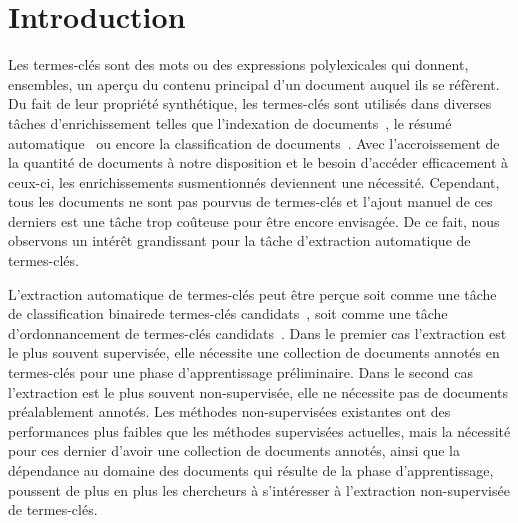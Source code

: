 \section{Introduction}
\label{sec:introduction}
  Les termes-clés sont des mots ou des expressions polylexicales qui donnent,
  ensembles, un aperçu du contenu principal d'un document auquel ils se
  réfèrent.
  Du fait de leur propriété synthétique, les termes-clés sont utilisés dans
  diverses tâches d'enrichissement telles que l'indexation de
  documents~\cite{medelyan2008smalltrainingset}, le résumé
  automatique~\cite{litvak2008graphbased} ou encore la classification de
  documents~\cite{han2007webdocumentclustering}. Avec l'accroissement de la
  quantité de documents à notre disposition et le besoin d'accéder efficacement
  à ceux-ci, les enrichissements susmentionnés deviennent une nécessité.
  Cependant, tous les documents ne sont pas pourvus de termes-clés et l'ajout
  manuel de ces derniers est une tâche trop coûteuse pour être encore envisagée.
  De ce fait, nous observons un intérêt grandissant pour la tâche d'extraction
  automatique de termes-clés.

  L'extraction automatique de termes-clés peut être perçue soit comme une tâche
  de classification binairede termes-clés candidats~\cite{witten1999kea}, soit
  comme une tâche d'ordonnancement de termes-clés
  candidats~\cite{mihalcea2004textrank}. Dans le premier cas l'extraction est le
  plus souvent supervisée, elle nécessite une collection de documents annotés en
  termes-clés pour une phase d'apprentissage préliminaire. Dans le second cas
  l'extraction est le plus souvent non-supervisée, elle ne nécessite pas de
  documents préalablement annotés. Les méthodes non-supervisées existantes ont
  des performances plus faibles que les méthodes supervisées actuelles, mais la
  nécessité pour ces dernier d'avoir une collection de documents annotés, ainsi
  que la dépendance au domaine des documents qui résulte de la phase
  d'apprentissage, poussent de plus en plus les chercheurs à s'intéresser à
  l'extraction non-supervisée de termes-clés.

